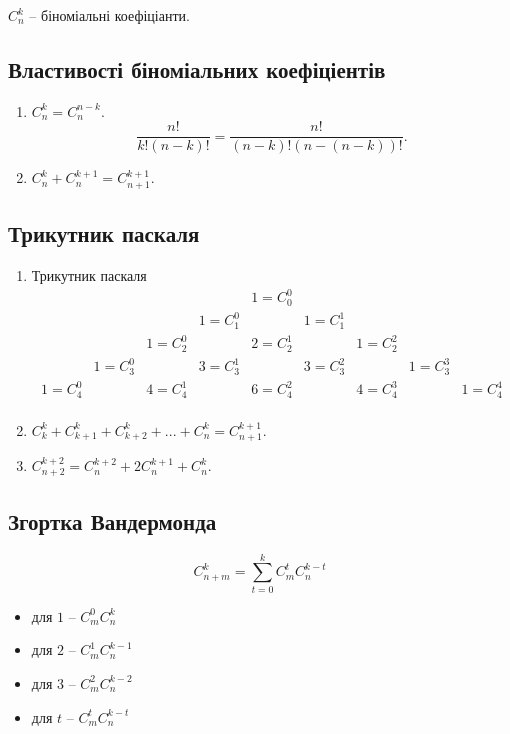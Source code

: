 $C_n^k$ -- біноміальні коефіціанти.

\subsection{Властивості біноміальних коефіціентів}

\begin{enumerate}
    \item $C_n^k = C_{n}^{n - k}$.
    $$\dfrac{n!}{k!(n - k)!} = \dfrac{n!}{(n - k)!(n - (n - k))!}.$$
    \item $C_n^k + C_{n}^{k + 1} = C_{n + 1}^{k + 1}$.
\end{enumerate}

\subsection{Трикутник паскаля}

\begin{enumerate}
    \item Трикутник паскаля
    \begin{equation*}
        \begin{matrix}
             & & & &1 = C_0^0& & & & \\
             & & &1 = C_1^0& &1 = C_1^1& & &\\
             & &1 = C_2^0& &2 = C_2^1& &1 = C_2^2& & \\
             &1 = C_3^0& &3 = C_3^1& &3 = C_3^2& &1 = C_3^3&\\
            1 = C_4^0& &4 = C_4^1& &6 = C_4^2& &4 = C_4^3& &1 = C_4^4\\
        \end{matrix}
    \end{equation*}
    \item  $C_{k}^{k} + C_{k + 1}^{k} + C_{k + 2}^{k} + ... + C_{n}^{k} = C_{n + 1}^{k + 1}$.
    \item $C_{n + 2}^{k + 2}  = C_n^{k + 2} + 2 C_n^{k + 1} + C_n^k$.
\end{enumerate}

\subsection{Згортка Вандермонда}

\begin{equation}
    C_{n + m}^k = \sum\limits_{t = 0}^{k} C_m^t C_n^{k - t}
\end{equation}

\begin{itemize} 
    \item для $1$ -- $C_m^0 C_{n}^{k}$
    \item для $2$ -- $C_m^1 C_{n}^{k-1}$
    \item для $3$ -- $C_m^2 C_{n}^{k-2}$
    \item для $t$ -- $C_m^t C_{n}^{k-t}$
\end{itemize}

